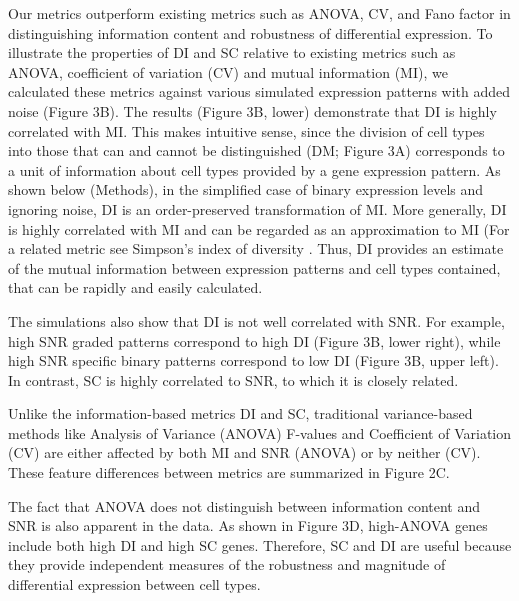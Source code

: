 Our metrics outperform existing metrics such as ANOVA, CV, and Fano factor in distinguishing information content and robustness of differential expression. To illustrate the properties of DI and SC relative to existing metrics such as ANOVA, coefficient of variation (CV) and mutual information (MI), we calculated these metrics against various simulated expression patterns with added noise (Figure 3B). The results (Figure 3B, lower) demonstrate that DI is highly correlated with MI. This makes intuitive sense, since the division of cell types into those that can and cannot be distinguished (DM; Figure 3A) corresponds to a unit of information about cell types provided by a gene expression pattern. As shown below (Methods), in the simplified case of binary expression levels and ignoring noise, DI is an order-preserved transformation of MI. More generally, DI is highly correlated with MI and can be regarded as an approximation to MI (For a related metric see Simpson's index of diversity \cite{SIMPSON_1949}. Thus, DI provides an estimate of the mutual information between expression patterns and cell types contained, that can be rapidly and easily calculated. 

The simulations also show that DI is not well correlated with SNR. For example, high SNR graded patterns correspond to high DI (Figure 3B, lower right), while high SNR specific binary patterns correspond to low DI (Figure 3B, upper left). In contrast, SC is highly correlated to SNR, to which it is closely related. 

Unlike the information-based metrics DI and SC, traditional variance-based methods like Analysis of Variance (ANOVA) F-values and Coefficient of Variation (CV) are either affected by both MI and SNR (ANOVA) or by neither (CV).  These feature differences between metrics are summarized in Figure 2C.

The fact that ANOVA does not distinguish between information content and SNR is also apparent in the data. As shown in Figure 3D, high-ANOVA genes include both high DI and high SC genes. Therefore, SC and DI are useful because they provide independent measures of the robustness and magnitude of differential expression between cell types.